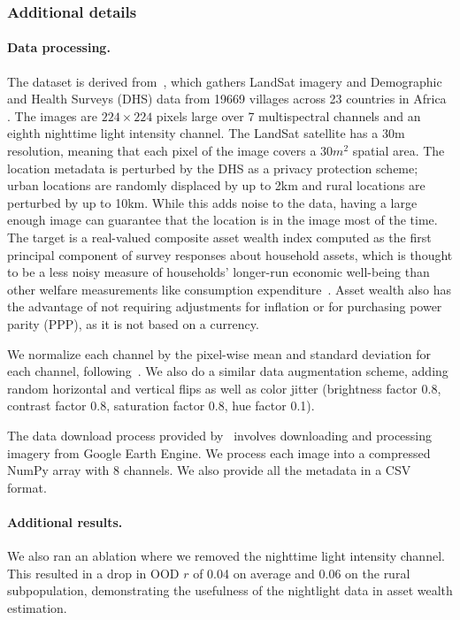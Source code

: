 \subsubsection{Additional details}\label{sec:app_povertymap_details}

\paragraph{Data processing.}
The \PovertyMap dataset is derived from~\citet{yeh2020poverty}, which gathers LandSat imagery and Demographic and Health Surveys (DHS) data from 19669 villages across 23 countries in Africa .
The images are $224 \times 224$ pixels large over 7 multispectral channels and an eighth nighttime light intensity channel. The LandSat satellite has a 30m resolution, meaning that each pixel of the image covers a $30m^2$ spatial area.
The location metadata is perturbed by the DHS as a privacy protection scheme; urban locations are randomly displaced by up to 2km and rural locations are perturbed by up to 10km. While this adds noise to the data, having a large enough image can guarantee that the location is in the image most of the time.
The target is a real-valued composite asset wealth index computed as the first principal component of survey responses about household assets, which is thought to be a less noisy measure of households' longer-run economic well-being than other welfare measurements like consumption expenditure~\citep{sahn2003asset,filmer2011asset}.
Asset wealth also has the advantage of not requiring adjustments for inflation or for purchasing power parity (PPP), as it is not based on a currency.

We normalize each channel by the pixel-wise mean and standard deviation for each channel, following~\citep{yeh2020poverty}. We also do a similar data augmentation scheme, adding random horizontal and vertical flips as well as color jitter (brightness factor 0.8, contrast factor 0.8, saturation factor 0.8, hue factor 0.1).

The data download process provided by~\citet{yeh2020poverty} involves downloading and processing imagery from Google Earth Engine. We process each image into a compressed NumPy array with 8 channels. We also provide all the metadata in a CSV format.

\paragraph{Additional results.}
We also ran an ablation where we removed the nighttime light intensity channel.
This resulted in a drop in OOD $r$ of 0.04 on average and 0.06 on the rural subpopulation, demonstrating the usefulness of the nightlight data in asset wealth estimation.

